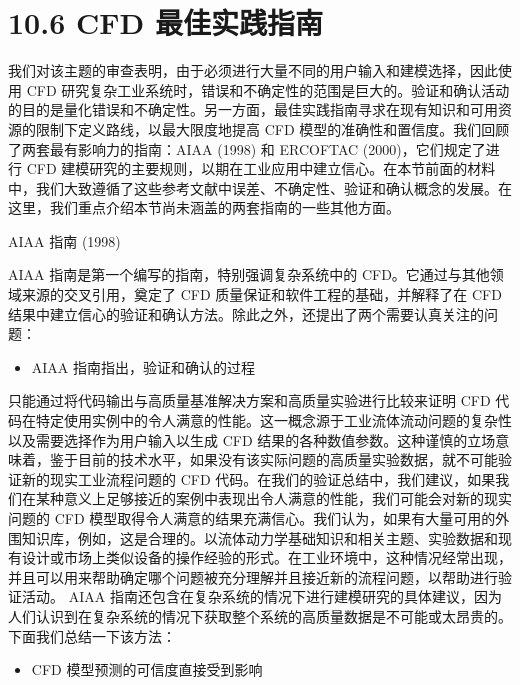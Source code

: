 \documentclass[11pt,a4paper,openany,fontset=none]{ctexbook}
\begin{document}
\section*{10.6 CFD 最佳实践指南}

我们对该主题的审查表明，由于必须进行大量不同的用户输入和建模选择，因此使用 CFD 研究复杂工业系统时，错误和不确定性的范围是巨大的。验证和确认活动的目的是量化错误和不确定性。另一方面，最佳实践指南寻求在现有知识和可用资源的限制下定义路线，以最大限度地提高 CFD 模型的准确性和置信度。我们回顾了两套最有影响力的指南：AIAA (1998) 和 ERCOFTAC (2000)，它们规定了进行 CFD 建模研究的主要规则，以期在工业应用中建立信心。在本节前面的材料中，我们大致遵循了这些参考文献中误差、不确定性、验证和确认概念的发展。在这里，我们重点介绍本节尚未涵盖的两套指南的一些其他方面。

AIAA 指南 (1998)

AIAA 指南是第一个编写的指南，特别强调复杂系统中的 CFD。它通过与其他领域来源的交叉引用，奠定了 CFD 质量保证和软件工程的基础，并解释了在 CFD 结果中建立信心的验证和确认方法。除此之外，还提出了两个需要认真关注的问题：

\begin{itemize}

\item AIAA 指南指出，验证和确认的过程

\end{itemize}

只能通过将代码输出与高质量基准解决方案和高质量实验进行比较来证明 CFD 代码在特定使用实例中的令人满意的性能。这一概念源于工业流体流动问题的复杂性以及需要选择作为用户输入以生成 CFD 结果的各种数值参数。这种谨慎的立场意味着，鉴于目前的技术水平，如果没有该实际问题的高质量实验数据，就不可能验证新的现实工业流程问题的 CFD 代码。在我们的验证总结中，我们建议，如果我们在某种意义上足够接近的案例中表现出令人满意的性能，我们可能会对新的现实问题的 CFD 模型取得令人满意的结果充满信心。我们认为，如果有大量可用的外围知识库，例如，这是合理的。以流体动力学基础知识和相关主题、实验数据和现有设计或市场上类似设备的操作经验的形式。在工业环境中，这种情况经常出现，并且可以用来帮助确定哪个问题被充分理解并且接近新的流程问题，以帮助进行验证活动。 AIAA 指南还包含在复杂系统的情况下进行建模研究的具体建议，因为人们认识到在复杂系统的情况下获取整个系统的高质量数据是不可能或太昂贵的。下面我们总结一下该方法：

\begin{itemize}

\item CFD 模型预测的可信度直接受到影响

\end{itemize}
\end{document}
